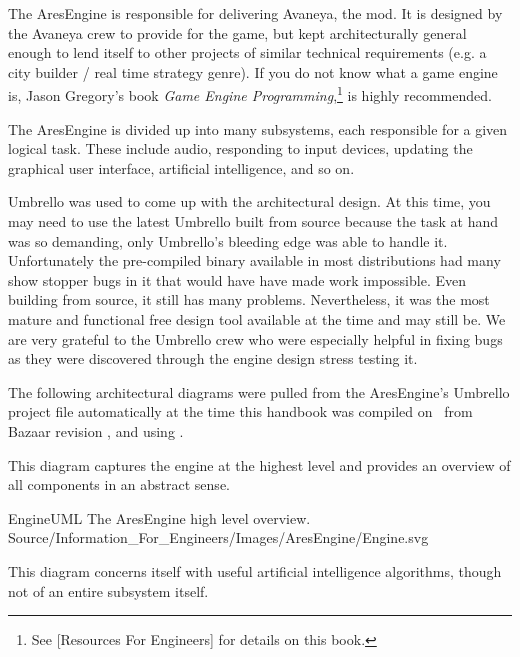 

The AresEngine is responsible for delivering Avaneya, the mod. It is designed by the Avaneya crew to provide for the game, but kept architecturally general enough to lend itself to other projects of similar technical requirements (e.g. a city builder / real time strategy genre). If you do not know what a game engine is, Jason Gregory's book {\it Game Engine Programming},\footnote{See [Resources For Engineers] for details on this book.} is highly recommended.

The AresEngine is divided up into many subsystems, each responsible for a given logical task. These include audio, responding to input devices, updating the graphical user interface, artificial intelligence, and so on.

Umbrello was used to come up with the architectural design. At this time, you may need to use the latest Umbrello built from source because the task at hand was so demanding, only Umbrello's bleeding edge was able to handle it. Unfortunately the pre-compiled binary available in most distributions had many show stopper bugs in it that would have have made work impossible. Even building from source, it still has many problems. Nevertheless, it was the most mature and functional free design tool available at the time and may still be. We are very grateful to the Umbrello crew who were especially helpful in fixing bugs as they were discovered through the engine design stress testing it.

The following architectural diagrams were pulled from the AresEngine's Umbrello project file automatically at the time this handbook was compiled on \currentdate\ from Bazaar revision \BazaarRevision, and using .

This diagram captures the engine at the highest level and provides an overview of all components in an abstract sense.

\FullPageLandscapeDiagram
    {EngineUML}
    {The AresEngine high level overview.}
    {Source/Information_For_Engineers/Images/AresEngine/Engine.svg}

This diagram concerns itself with useful artificial intelligence algorithms, though not of an entire subsystem itself.

